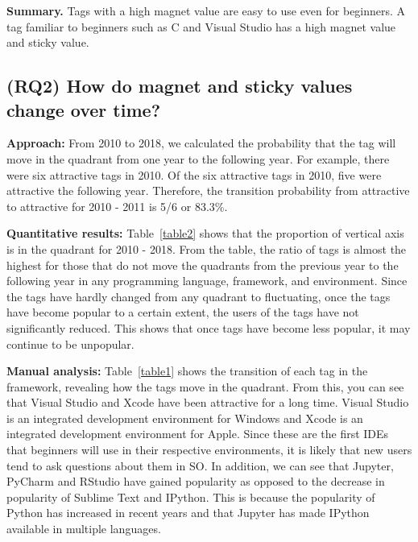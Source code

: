 \documentclass[conference]{IEEEtran}
\begin{document}
\noindent \textbf{Summary.}
 Tags with a high magnet value are easy to use even for beginners. A tag familiar to beginners such as C and Visual Studio has a high magnet value and sticky value.

\subsection{(RQ2) How do magnet and sticky values change over time?} 

\noindent \textbf{Approach:}
From 2010 to 2018, we calculated the probability that the tag will move in the quadrant from one year to the following year. For example, there were six attractive tags in 2010. Of the six attractive tags in 2010, five were attractive the following year. Therefore, the transition probability from attractive to attractive for 2010 - 2011 is 5/6 or 83.3\%. 

\noindent \textbf{Quantitative results:}
Table~\ref{table2} shows that the proportion of vertical axis is in the quadrant for 2010 - 2018. From the table, the ratio of tags is almost the highest for those that do not move the quadrants from the previous year to the following year in any programm{}ing language, framework, and environment. Since the tags have hardly changed from any quadrant to fluctuating, once the tags have become popular to a certain extent, the users of the tags have not significantly reduced. This shows that once tags have become less popular, it may continue to be unpopular.

\noindent \textbf{Manual analysis:}
Table~\ref{table1} shows the transition of each tag in the framework, revealing how the tags move in the quadrant. From this, you can see that Visual Studio\cite{johnson2012professional} and Xcode\cite{tisato1984xcode} have been attractive for a long time. Visual Studio is an integrated development environment for Windows and Xcode is an integrated development environment for Apple. Since these are the first IDEs that beginners will use in their respective environments, it is likely that new users tend to ask questions about them in SO. In addition, we can see that Jupyter\cite{perkel2018jupyter}, PyCharm\cite{islam2015mastering} and RStudio\cite{allaire2012rstudio} have gained popularity as opposed to the decrease in popularity of Sublime Text\cite{peleg2013mastering} and IPython\cite{perez2007ipython}. This is because the popularity of Python has increased in recent years and that Jupyter has made IPython available in multiple languages.
\end{document}
